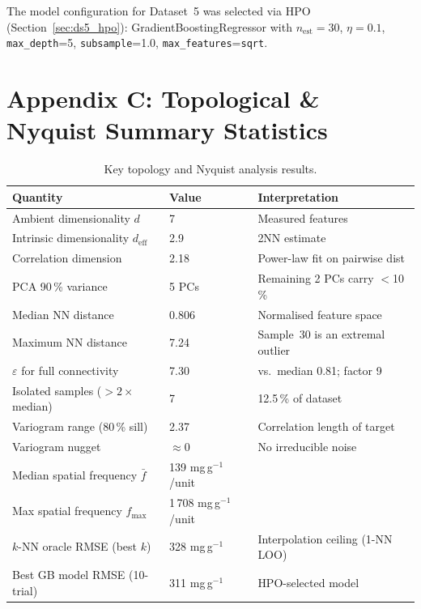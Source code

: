 \documentclass[12pt,a4paper]{article}
\begin{document}
The model configuration for Dataset~5 was selected via HPO
(Section~\ref{sec:ds5_hpo}): GradientBoostingRegressor with
$n_\text{est}=30$, $\eta=0.1$, \texttt{max\_depth}=5,
\texttt{subsample}=1.0, \texttt{max\_features}=\texttt{sqrt}.

\section*{Appendix C: Topological \& Nyquist Summary Statistics}
\label{app:topo}

\begin{table}[h]
\centering
\caption{Key topology and Nyquist analysis results.}
\label{tab:topo_summary}
\begin{tabular}{lll}
\toprule
Quantity & Value & Interpretation \\
\midrule
Ambient dimensionality $d$ & 7 & Measured features \\
Intrinsic dimensionality $d_\text{eff}$ & 2.9 & 2NN estimate \\
Correlation dimension & 2.18 & Power-law fit on pairwise dist \\
PCA 90\,\% variance & 5 PCs & Remaining 2 PCs carry $<$10\,\% \\
\midrule
Median NN distance & 0.806 & Normalised feature space \\
Maximum NN distance & 7.24 & Sample~30 is an extremal outlier \\
$\varepsilon$ for full connectivity & 7.30 & vs.\ median 0.81; factor 9 \\
Isolated samples ($>2\times$median) & 7 & 12.5\,\% of dataset \\
\midrule
Variogram range (80\,\% sill) & 2.37 & Correlation length of target \\
Variogram nugget & $\approx 0$ & No irreducible noise \\
Median spatial frequency $\bar{f}$ & 139 mg\,g$^{-1}$/unit & \\
Max spatial frequency $f_\text{max}$ & 1\,708 mg\,g$^{-1}$/unit & \\
\midrule
$k$-NN oracle RMSE (best $k$) & 328 mg\,g$^{-1}$ & Interpolation ceiling (1-NN LOO) \\
Best GB model RMSE (10-trial) & 311 mg\,g$^{-1}$ & HPO-selected model \\

\end{tabular}
\end{table}
\end{document}
